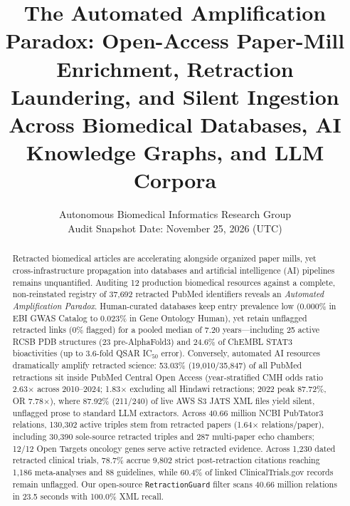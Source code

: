 \documentclass[11pt,letterpaper]{article}
\title{\textbf{The Automated Amplification Paradox: Open-Access Paper-Mill Enrichment, Retraction Laundering, and Silent Ingestion Across Biomedical Databases, AI Knowledge Graphs, and LLM Corpora}}
\author{Autonomous Biomedical Informatics Research Group\\
\small Audit Snapshot Date: November 25, 2026 (UTC)}
\date{}
\begin{document}
\maketitle

\begin{abstract}
Retracted biomedical articles are accelerating alongside organized paper mills, yet cross-infrastructure propagation into databases and artificial intelligence (AI) pipelines remains unquantified. Auditing 12 production biomedical resources against a complete, non-reinstated registry of 37,692 retracted PubMed identifiers reveals an \emph{Automated Amplification Paradox}. Human-curated databases keep entry prevalence low (0.000\% in EBI GWAS Catalog to 0.023\% in Gene Ontology Human), yet retain unflagged retracted links (0\% flagged) for a pooled median of 7.20 years—including 25 active RCSB PDB structures (23 pre-AlphaFold3) and 24.6\% of ChEMBL STAT3 bioactivities (up to 3.6-fold QSAR IC$_{50}$ error). Conversely, automated AI resources dramatically amplify retracted science: 53.03\% (19,010/35,847) of all PubMed retractions sit inside PubMed Central Open Access (year-stratified CMH odds ratio 2.63$\times$ across 2010--2024; 1.83$\times$ excluding all Hindawi retractions; 2022 peak 87.72\%, OR 7.78$\times$), where 87.92\% (211/240) of live AWS S3 JATS XML files yield silent, unflagged prose to standard LLM extractors. Across 40.66 million NCBI PubTator3 relations, 130,302 active triples stem from retracted papers (1.64$\times$ relations/paper), including 30,390 sole-source retracted triples and 287 multi-paper echo chambers; 12/12 Open Targets oncology genes serve active retracted evidence. Across 1,230 dated retracted clinical trials, 78.7\% accrue 9,802 strict post-retraction citations reaching 1,186 meta-analyses and 88 guidelines, while 60.4\% of linked ClinicalTrials.gov records remain unflagged. Our open-source \texttt{RetractionGuard} filter scans 40.66 million relations in 23.5 seconds with 100.0\% XML recall.
\end{abstract}
\end{document}
